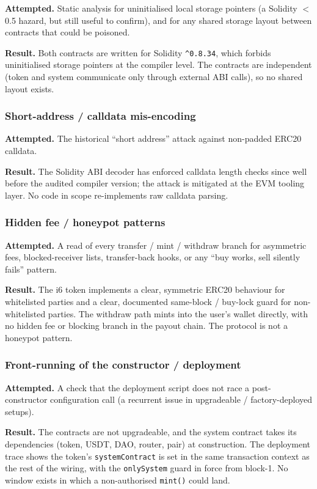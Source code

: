 \documentclass[11pt,a4paper]{article}
\begin{document}
\textbf{Attempted.} Static analysis for uninitialised local storage
pointers (a Solidity \(<\)0.5 hazard, but still useful to confirm), and for
any shared storage layout between contracts that could be poisoned.

\textbf{Result.} Both contracts are written for Solidity \texttt{\^{}0.8.34},
which forbids uninitialised storage pointers at the compiler level. The
contracts are independent (token and system communicate only through
external ABI calls), so no shared layout exists.

\subsubsection*{Short-address / calldata mis-encoding}

\textbf{Attempted.} The historical ``short address'' attack against
non-padded ERC20 calldata.

\textbf{Result.} The Solidity ABI decoder has enforced calldata length
checks since well before the audited compiler version; the attack is
mitigated at the EVM tooling layer. No code in scope re-implements raw
calldata parsing.

\subsubsection*{Hidden fee / honeypot patterns}

\textbf{Attempted.} A read of every transfer / mint / withdraw branch for
asymmetric fees, blocked-receiver lists, transfer-back hooks, or any
``buy works, sell silently fails'' pattern.

\textbf{Result.} The i6 token implements a clear, symmetric ERC20
behaviour for whitelisted parties and a clear, documented same-block /
buy-lock guard for non-whitelisted parties. The withdraw path mints into
the user's wallet directly, with no hidden fee or blocking branch in the
payout chain. The protocol is not a honeypot pattern.

\subsubsection*{Front-running of the constructor / deployment}

\textbf{Attempted.} A check that the deployment script does not race a
post-constructor configuration call (a recurrent issue in upgradeable /
factory-deployed setups).

\textbf{Result.} The contracts are not upgradeable, and the system contract
takes its dependencies (token, USDT, DAO, router, pair) at construction.
The deployment trace shows the token's \texttt{systemContract} is set
in the same transaction context as the rest of the wiring, with the
\texttt{onlySystem} guard in force from block-1. No window exists in which
a non-authorised \texttt{mint()} could land.
\end{document}
